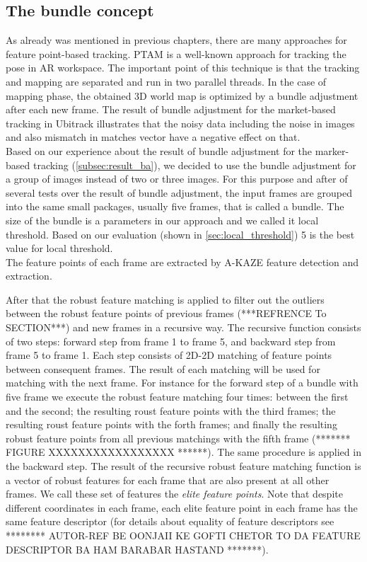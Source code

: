 \subsection{The bundle concept}
As already was mentioned in previous chapters, there are many approaches for feature point-based tracking. PTAM \cite{klein2007parallel} is a well-known approach for tracking the pose in AR workspace. The important point of this technique is that the tracking and mapping are separated and run in two parallel threads. In the case of mapping phase, the obtained 3D world map is optimized by a bundle adjustment after each new frame. The result of bundle adjustment for the market-based tracking in Ubitrack illustrates that the noisy data including the noise in images and also mismatch in matches vector have a negative effect on that.\\
Based on our experience about the result of bundle adjustment for the marker-based tracking (\autoref{subsec:result_ba}), we decided to use the bundle adjustment for a group of images instead of two or three images. For this purpose and after of several tests over the result of bundle adjustment, the input frames are grouped into the same small packages, usually five frames, that is called a bundle. The size of the bundle is a parameters in our approach and we called it local threshold. Based on our evaluation (shown in \autoref{sec:local_threshold}) 5 is the best value for local threshold.\\
The feature points of each frame are extracted by A-KAZE feature detection and extraction. 



After that the robust feature matching is applied to filter out the outliers between the robust feature points of previous frames (***REFRENCE To SECTION***) and new frames in a recursive way. 
The recursive function consists of two steps: forward step from frame 1 to frame 5, and backward step from frame 5 to frame 1. Each step consists of 2D-2D matching of feature points between consequent frames. The result of each matching will be used for matching with the next frame. For instance for the forward step of a bundle with five frame we execute the robust feature matching four times: between the first and the second; the resulting roust feature points with the third frames; the resulting roust feature points with the forth frames; and finally the resulting robust feature points from all previous matchings with the fifth frame (******* FIGURE XXXXXXXXXXXXXXXXX ******). The same procedure is applied in the backward step. 
The result of the recursive robust feature matching function is a vector of robust features for each frame that are also present at all other frames. We call these set of features the \textit{elite feature points}. Note that despite different coordinates in each frame, each elite feature point in each frame has the same feature descriptor (for details about equality of feature descriptors see ******** AUTOR-REF BE OONJAII KE GOFTI CHETOR TO DA FEATURE DESCRIPTOR BA HAM BARABAR HASTAND *******). 

